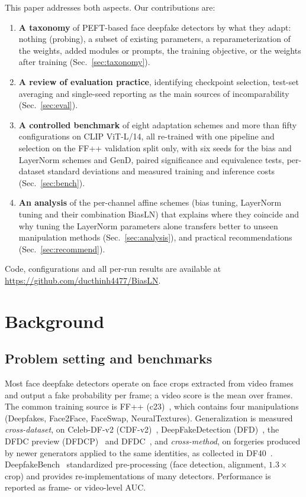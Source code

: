 \documentclass[fonts]{icst}
\begin{document}
This paper addresses both aspects. Our contributions are:
\begin{enumerate}
    \item \textbf{A taxonomy} of PEFT-based face deepfake detectors by what they adapt: nothing (probing), a subset of existing parameters, a reparameterization of the weights, added modules or prompts, the training objective, or the weights after training (Sec.~\ref{sec:taxonomy}).
    \item \textbf{A review of evaluation practice}, identifying checkpoint selection, test-set averaging and single-seed reporting as the main sources of incomparability (Sec.~\ref{sec:eval}).
    \item \textbf{A controlled benchmark} of eight adaptation schemes and more than fifty configurations on CLIP ViT-L/14, all re-trained with one pipeline and selection on the FF++ validation split only, with six seeds for the bias and LayerNorm schemes and GenD, paired significance and equivalence tests, per-dataset standard deviations and measured training and inference costs (Sec.~\ref{sec:bench}).
    \item \textbf{An analysis} of the per-channel affine schemes (bias tuning, LayerNorm tuning and their combination BiasLN) that explains where they coincide and why tuning the LayerNorm parameters alone transfers better to unseen manipulation methods (Sec.~\ref{sec:analysis}), and practical recommendations (Sec.~\ref{sec:recommend}).
\end{enumerate}
Code, configurations and all per-run results are available at \href{https://github.com/ducthinh4477/BiasLN}{https://github.com/ducthinh4477/BiasLN}.

\section{Background}
\label{sec:background}

\subsection{Problem setting and benchmarks}
Most face deepfake detectors operate on face crops extracted from video frames and output a fake probability per frame; a video score is the mean over frames. The common training source is FF++ (c23)~\cite{rossler2019ff}, which contains four manipulations (Deepfakes, Face2Face, FaceSwap, NeuralTextures). Generalization is measured \emph{cross-dataset}, on Celeb-DF-v2 (CDF-v2)~\cite{li2020celeb}, DeepFakeDetection (DFD)~\cite{dufour2019dfd}, the DFDC preview (DFDCP)~\cite{dolhansky2019dfdcp} and DFDC~\cite{dolhansky2020dfdc}, and \emph{cross-method}, on forgeries produced by newer generators applied to the same identities, as collected in DF40~\cite{yan2024df40}. DeepfakeBench~\cite{yan2023deepfakebench} standardized pre-processing (face detection, alignment, $1.3\times$ crop) and provides re-implementations of many detectors. Performance is reported as frame- or video-level AUC.
\end{document}
